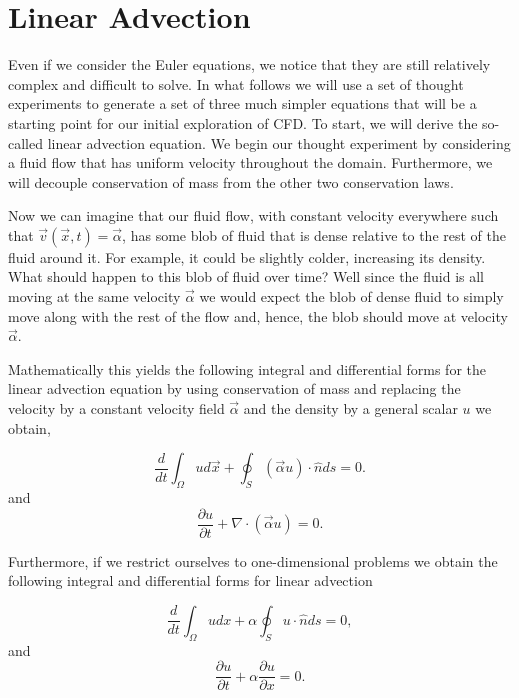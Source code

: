 \section{Linear Advection}
Even if we consider the Euler equations, we notice that they are still relatively complex and difficult to solve. In what follows we will use a set of thought experiments to generate a set of three much simpler equations that will be a starting point for our initial exploration of CFD. To start, we will derive the so-called linear advection equation. We begin our thought experiment by considering a fluid flow that has uniform velocity throughout the domain. Furthermore, we will decouple conservation of mass from the other two conservation laws. 

Now we can imagine that our fluid flow, with constant velocity everywhere such that $\vec{v}(\vec{x},t) = \vec{\alpha}$, has some blob of fluid that is dense relative to the rest of the fluid around it. For example, it could be slightly colder, increasing its density. What should happen to this blob of fluid over time? Well since the fluid is all moving at the same velocity $\vec{\alpha}$ we would expect the blob of dense fluid to simply move along with the rest of the flow and, hence, the blob should move at velocity $\vec{\alpha}$.

Mathematically this yields the following integral and differential forms for the linear advection equation by using conservation of mass and replacing the velocity by a constant velocity field $\vec{\alpha}$ and the density by a general scalar $u$ we obtain,
\begin{eqBox}
\begin{equation}
	\frac{d}{dt}\int_\Omega u d\vec{x} + \oint_S (\vec{\alpha}u) \cdot \hat{n} ds = 0.
\end{equation}
and
\begin{equation}
	\frac{\partial u}{\partial t} + \nabla \cdot (\vec{\alpha} u) = 0.
\end{equation}
\end{eqBox}
Furthermore, if we restrict ourselves to one-dimensional problems we obtain the following integral and differential forms for linear advection
\begin{eqBox}
\begin{equation}
	\frac{d}{dt}\int_\Omega u dx + \alpha \oint_S u \cdot \hat{n} ds = 0,
\end{equation}
and
\begin{equation}
	\frac{\partial u}{\partial t} +  \alpha \frac{\partial u}{\partial x} = 0.
\end{equation}
\end{eqBox}

